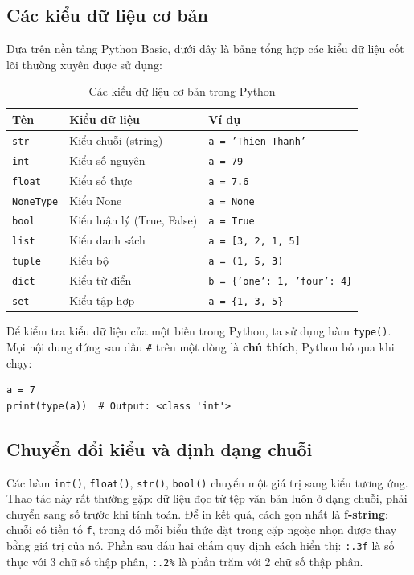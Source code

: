 \subsection{Các kiểu dữ liệu cơ bản}
Dựa trên nền tảng Python Basic, dưới đây là bảng tổng hợp các kiểu dữ liệu cốt lõi thường xuyên được sử dụng:

\begin{table}[H]
\centering
\begin{tabular}{|l|l|l|}
\hline
\textbf{Tên} & \textbf{Kiểu dữ liệu} & \textbf{Ví dụ} \\
\hline
\texttt{str} & Kiểu chuỗi (string) & \texttt{a = 'Thien Thanh'} \\
\hline
\texttt{int} & Kiểu số nguyên & \texttt{a = 79} \\
\hline
\texttt{float} & Kiểu số thực & \texttt{a = 7.6} \\
\hline
\texttt{NoneType} & Kiểu None & \texttt{a = None} \\
\hline
\texttt{bool} & Kiểu luận lý (True, False) & \texttt{a = True} \\
\hline
\texttt{list} & Kiểu danh sách & \texttt{a = [3, 2, 1, 5]} \\
\hline
\texttt{tuple} & Kiểu bộ & \texttt{a = (1, 5, 3)} \\
\hline
\texttt{dict} & Kiểu từ điển & \texttt{b = \{'one': 1, 'four': 4\}} \\
\hline
\texttt{set} & Kiểu tập hợp & \texttt{a = \{1, 3, 5\}} \\
\hline
\end{tabular}
\caption{Các kiểu dữ liệu cơ bản trong Python}
\label{tab:python-types}
\end{table}

Để kiểm tra kiểu dữ liệu của một biến trong Python, ta sử dụng hàm \texttt{type()}. Mọi nội dung đứng sau dấu \texttt{\#} trên một dòng là \textbf{chú thích}, Python bỏ qua khi chạy:

\begin{lstlisting}[caption={Kiểm tra kiểu dữ liệu}]
a = 7
print(type(a))  # Output: <class 'int'>
\end{lstlisting}

\subsection{Chuyển đổi kiểu và định dạng chuỗi}

Các hàm \texttt{int()}, \texttt{float()}, \texttt{str()}, \texttt{bool()} chuyển một giá trị sang kiểu tương ứng. Thao tác này rất thường gặp: dữ liệu đọc từ tệp văn bản luôn ở dạng chuỗi, phải chuyển sang số trước khi tính toán. Để in kết quả, cách gọn nhất là \textbf{f-string}: chuỗi có tiền tố \texttt{f}, trong đó mỗi biểu thức đặt trong cặp ngoặc nhọn được thay bằng giá trị của nó. Phần sau dấu hai chấm quy định cách hiển thị: \texttt{:.3f} là số thực với 3 chữ số thập phân, \texttt{:.2\%} là phần trăm với 2 chữ số thập phân.

